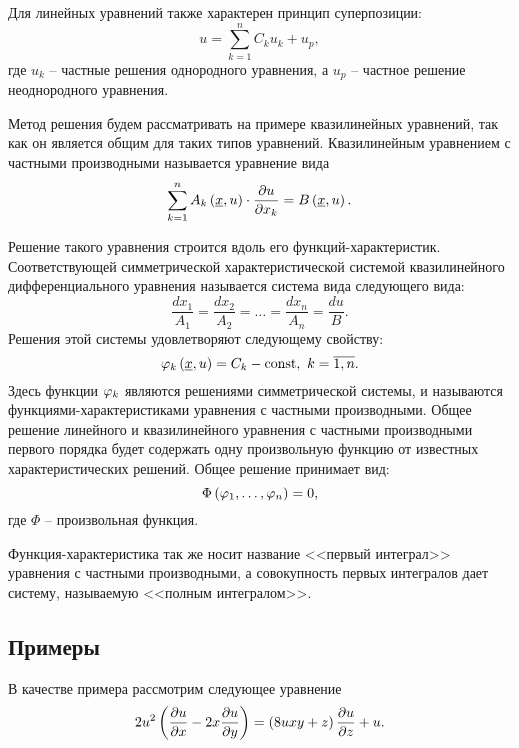 	Для линейных уравнений также характерен принцип суперпозиции:
	\[ u = \sum_{k = 1}^{n} C_k u_k + u_{p}, \]
	где \( u_k \) -- частные решения однородного уравнения, а \( u_p \) -- частное решение неоднородного уравнения.

	\vspace{15pt}

	Метод решения будем рассматривать на примере квазилинейных уравнений, так как он является общим для таких типов уравнений. Квазилинейным уравнением с частными производными называется уравнение вида
	\[ \sum_{k = 1}^{n} A_k \left( \underline{x}, u \right) \cdot \dfrac{\partial u}{\partial x_k} = B \left( \underline{x}, u \right). \]

	Решение такого уравнения строится вдоль его функций-характеристик. Соответствующей симметрической характеристической системой квазилинейного дифференциального уравнения называется система вида следующего вида:
	\[ \frac{dx_1}{A_1} = \frac{dx_2}{A_2} = \dots = \frac{dx_n}{A_n} = \frac{du}{B}. \]
	Решения этой системы удовлетворяют следующему свойству:
	\[ \varphi_k \left( \underline{x}, u \right) = C_k - \mathrm{const}, ~ k = \overline{1, n}. \] 
	Здесь функции $\varphi_k$ являются решениями симметрической системы, и называются функциями-характеристиками уравнения с частными производными. Общее решение линейного и квазилинейного уравнения с частными производными первого порядка будет содержать одну произвольную функцию от известных характеристических решений. Общее решение принимает вид:
	\[ \Phi \left( \varphi_1, \dots, \varphi_n \right) = 0, \]
	где $\Phi$ -- произвольная функция.

	\vspace{15pt}
	
	Функция-характеристика так же носит название <<первый интеграл>> уравнения с частными производными, а совокупность первых интегралов дает систему, называемую <<полным интегралом>>.
	
	\subsection{Примеры}

		В качестве примера рассмотрим следующее уравнение
		\[ 2u^2 \left(  \dfrac{\partial u}{\partial x} - 2x \dfrac{\partial u}{\partial y} \right) = \left(  8uxy + z  \right) \dfrac{\partial u}{\partial z} + u. \]

